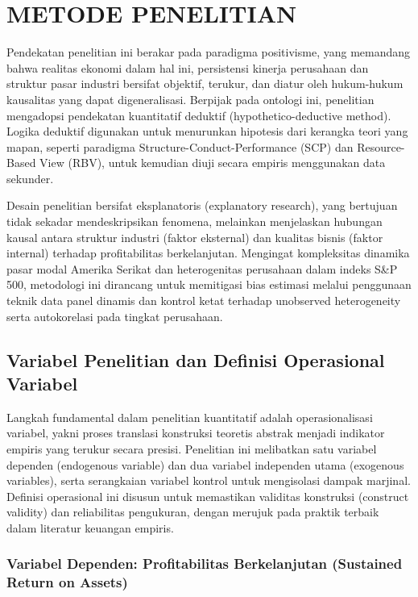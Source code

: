 \documentclass[12pt,a4paper]{report}
\begin{document}
\hypertarget{metode-penelitian}{%
\chapter{METODE PENELITIAN}\label{metode-penelitian}}

Pendekatan penelitian ini berakar pada paradigma positivisme, yang
memandang bahwa realitas ekonomi dalam hal ini, persistensi kinerja
perusahaan dan struktur pasar industri bersifat objektif, terukur, dan
diatur oleh hukum-hukum kausalitas yang dapat digeneralisasi. Berpijak
pada ontologi ini, penelitian mengadopsi pendekatan kuantitatif deduktif
(hypothetico-deductive method). Logika deduktif digunakan untuk
menurunkan hipotesis dari kerangka teori yang mapan, seperti paradigma
Structure-Conduct-Performance (SCP) dan Resource-Based View (RBV), untuk
kemudian diuji secara empiris menggunakan data sekunder.

Desain penelitian bersifat eksplanatoris (explanatory research), yang
bertujuan tidak sekadar mendeskripsikan fenomena, melainkan menjelaskan
hubungan kausal antara struktur industri (faktor eksternal) dan kualitas
bisnis (faktor internal) terhadap profitabilitas berkelanjutan.
Mengingat kompleksitas dinamika pasar modal Amerika Serikat dan
heterogenitas perusahaan dalam indeks S\&P 500, metodologi ini dirancang
untuk memitigasi bias estimasi melalui penggunaan teknik data panel
dinamis dan kontrol ketat terhadap unobserved heterogeneity serta
autokorelasi pada tingkat perusahaan.

\hypertarget{variabel-penelitian-dan-definisi-operasional-variabel}{%
\section{Variabel Penelitian dan Definisi Operasional
Variabel}\label{variabel-penelitian-dan-definisi-operasional-variabel}}

Langkah fundamental dalam penelitian kuantitatif adalah operasionalisasi
variabel, yakni proses translasi konstruksi teoretis abstrak menjadi
indikator empiris yang terukur secara presisi. Penelitian ini melibatkan
satu variabel dependen (endogenous variable) dan dua variabel independen
utama (exogenous variables), serta serangkaian variabel kontrol untuk
mengisolasi dampak marjinal. Definisi operasional ini disusun untuk
memastikan validitas konstruksi (construct validity) dan reliabilitas
pengukuran, dengan merujuk pada praktik terbaik dalam literatur keuangan
empiris.

\hypertarget{variabel-dependen-profitabilitas-berkelanjutan-sustained-return-on-assets}{%
\subsection{Variabel Dependen: Profitabilitas Berkelanjutan (Sustained
Return on
Assets)}\label{variabel-dependen-profitabilitas-berkelanjutan-sustained-return-on-assets}}
\end{document}
